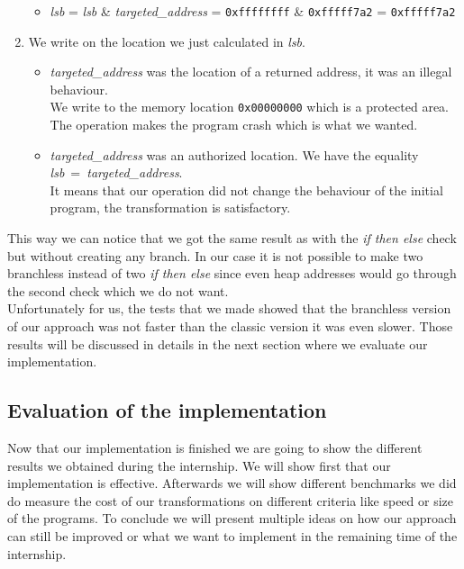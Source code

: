 \documentclass[11pt]{sdm}
\begin{document}
\begin{enumerate}
\begin{itemize}
			\item \textit{lsb} = \textit{lsb} \& \textit{targeted\_address} = \texttt{0xffffffff} \& \texttt{0xfffff7a2} = \texttt{0xfffff7a2}
		\end{itemize}
	\item We write on the location we just calculated in \textit{lsb}.
		\begin{itemize}
			\item \textit{targeted\_address} was the location of a returned address, it was an illegal behaviour.\\
			We write to the memory location \texttt{0x00000000} which is a protected area. The operation makes the program crash which is what we wanted.
			\item \textit{targeted\_address} was an authorized location. We have the equality \textit{lsb}~=~\textit{targeted\_address}.\\
				It means that our operation did not change the behaviour of the initial program, the transformation is satisfactory.				
		\end{itemize}
\end{enumerate}

This way we can notice that we got the same result as with the \textit{if then else} check but without creating any branch. In our case it is not possible to make two branchless instead of two \textit{if then else} since even heap addresses would go through the second check which we do not want. \\
Unfortunately for us, the tests that we made showed that the branchless version of our approach was not faster than the classic version it was even slower. Those results will be discussed in details in the next section where we evaluate our implementation.

\subsection{Evaluation of the implementation}
\label{sub:evaluation_of_implem}
Now that our implementation is finished we are going to show the different results we obtained during the internship.
We will show first that our implementation is effective. 
Afterwards we will show different benchmarks we did do measure the cost of our transformations on different criteria like speed or size of the programs.
To conclude we will present multiple ideas on how our approach can still be improved or what we want to implement in the remaining time of the internship. 
\end{document}
